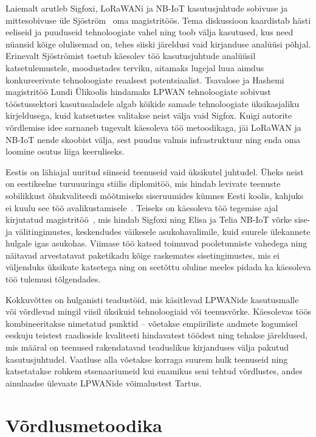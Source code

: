 \documentclass[12pt]{article}
\begin{document}
    Laiemalt arutleb Sigfoxi, LoRaWANi ja NB-IoT kasutusjuhtude sobivuse ja mittesobivuse üle Sjöström~\cite{sjostrom2017unlicensed} oma magistritöös.
    Tema diskussioon kaardistab hästi eeliseid ja puuduseid tehnoloogiate vahel ning toob välja kasutused, kus need nüansid kõige olulisemad on, tehes siiski järeldusi vaid kirjanduse analüüsi põhjal.
    Erinevalt Sjöströmist toetub käesolev töö kasutusjuhtude analüüsil katsetulemustele, moodustades terviku, aitamaks lugejal luua aimdus konkureerivate tehnoloogiate reaalsest potentsiaalist.
    Tsavalose ja Hashemi~\cite{tsavalos2018low} magistritöö Lundi Ülikoolis hindamaks LPWAN tehnoloogiate sobivust tööstussektori kasutusaladele algab kõikide samade tehnoloogiate üksikasjaliku kirjeldusega, kuid katsetustes valitakse neist välja vaid Sigfox.
    Kuigi autorite võrdlemise idee sarnaneb tugevalt käesoleva töö metoodikaga, jäi LoRaWAN ja NB-IoT nende skoobist välja, sest puudus valmis infrastruktuur ning enda oma loomine osutus liiga keeruliseks.

    Eestis on lähiajal uuritud siinseid teenuseid vaid üksikutel juhtudel.
    Üheks neist on eestikeelne turuuuringu stiilis diplomitöö, mis hindab levivate teenuste sobilikkust õhukvaliteedi mõõtmiseks siseruumides kümnes Eesti koolis, kahjuks ei kuulu see töö avalikustamisele~\cite{sild2019}.
    Teiseks on käesoleva töö tegemise ajal kirjutatud magistritöö~, mis hindab Sigfoxi ning Elisa ja Telia NB-IoT võrke sise- ja välitingimustes, keskendudes väikesele asukohavalimile, kuid suurele ülekannete hulgale igas asukohas.
    Viimase töö katsed toimuvad pooletunniste vahedega ning näitavad arvestatavat paketikadu kõige raskemates sisetingimustes, mis ei väljenduks üksikute katsetega ning on seetõttu oluline meeles pidada ka käesoleva töö tulemusi tõlgendades.

    Kokkuvõttes on hulganisti teadustöid, mis käsitlevad LPWANide kasutusmalle või võrdlevad mingil viisil üksikuid tehnoloogiaid või teenusvõrke.
    Käesolevas töös kombineeritakse nimetatud punktid -- võetakse empiiriliste andmete kogumisel eeskuju teistest raadioside kvaliteeti hindavatest töödest ning tehakse järeldused, mis määral on teenused rakendatavad teaduslikus kirjanduses välja pakutud kasutusjuhtudel.
    Vaatluse alla võetakse korraga suurem hulk teenuseid ning katsetatakse rohkem stsenaariumeid kui enamikus seni tehtud võrdlustes, andes ainulaadse ülevaate LPWANide võimalustest Tartus.

    \newpage

    \section{Võrdlusmetoodika}
\end{document}
